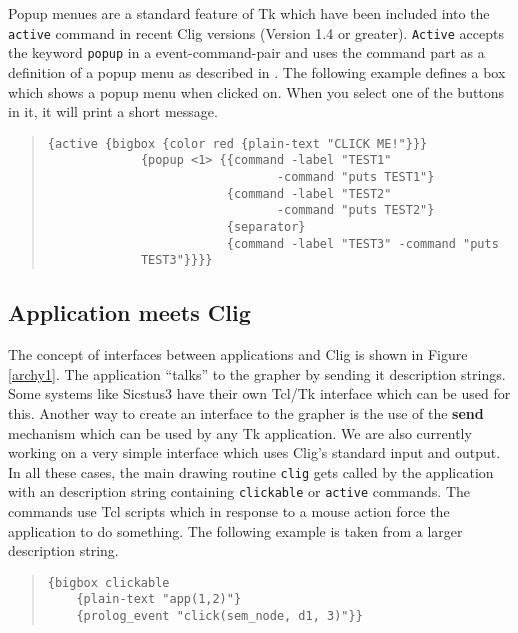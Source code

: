 Popup menues are a standard feature of {\sc Tk} which have been
included into the {\tt active} command in recent {\sc Clig} versions
(Version 1.4 or greater). {\tt Active} accepts the keyword {\tt popup}
in a event-command-pair and uses the command part as a definition of a
popup menu as described in \cite{Ousterhout 94}. The following example
defines a box which shows a popup menu when clicked on. When you select
one of the buttons in it, it will print a short message.

\begin{quote}
\begin{verbatim}
{active {bigbox {color red {plain-text "CLICK ME!"}}}
             {popup <1> {{command -label "TEST1" 
                                -command "puts TEST1"}
                         {command -label "TEST2" 
                                -command "puts TEST2"}
                         {separator}
                         {command -label "TEST3" -command "puts
             TEST3"}}}}
\end{verbatim}
\end{quote}

\subsection{Application meets {\sc Clig}}

The concept of interfaces between applications and {\sc Clig} is shown
in Figure \ref{archy1}. The application ``talks'' to the grapher by
sending it description strings. Some systems like {\sc Sicstus3} have
their own {\sc Tcl/Tk} interface which can be used for this. Another
way to create an interface to the grapher is the use of the {\bf send}
mechanism which can be used by any {\sc Tk} application. We are also
currently working on a very simple interface which uses {\sc Clig}'s
standard input and output. In all these cases, the main drawing routine
{\tt clig} gets called by the application with an description string
containing {\tt clickable} or {\tt active} commands. The commands use
{\sc Tcl} scripts which in response to a mouse action force the
application to do something. The following example is taken from a
larger description string.

\begin{quote}
\begin{verbatim}
{bigbox clickable 
	{plain-text "app(1,2)"}
	{prolog_event "click(sem_node, d1, 3)"}}
\end{verbatim}
\end{quote}

